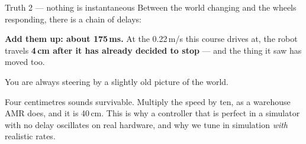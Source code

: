 \documentclass[aspectratio=169]{beamer}
\begin{document}
\begin{frame}{Truth 2 --- nothing is instantaneous}
  \small
  Between the world changing and the wheels responding, there is a chain of delays:

  \vspace{0.4em}
  \begin{center}
  \end{center}

  \vspace{0.5em}
  \small
  \textbf{Add them up: about 175\,ms.} At the 0.22\,m/s this course drives at, the robot
  travels \textbf{4\,cm after it has already decided to stop} --- and the thing it saw has
  moved too.

  \vspace{0.5em}
  \centering\small You are always steering by a slightly old picture of the world.

  \vspace{0.4em}
  \begin{inthefield}
    \footnotesize
    Four centimetres sounds survivable. Multiply the speed by ten, as a warehouse AMR does, and
    it is 40\,cm. This is why a controller that is perfect in a simulator with no delay
    oscillates on real hardware, and why we tune in simulation \emph{with} realistic rates.
  \end{inthefield}
\end{frame}
\end{document}
